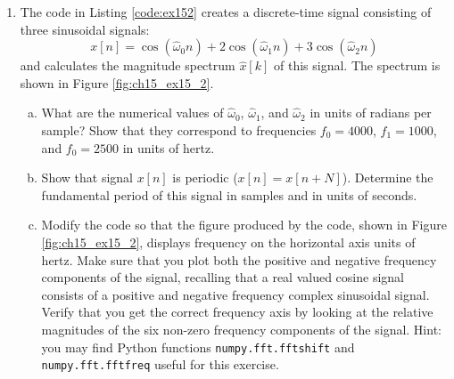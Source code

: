 \begin{enumerate}
\item The code in Listing \ref{code:ex152} creates a discrete-time signal consisting of three sinusoidal signals:
\begin{equation}
x[n]=\cos(\hat{\omega}_0 n)+2\cos(\hat{\omega}_1 n)+3\cos(\hat{\omega}_2 n)
\label{eq:ex15_2}
\end{equation}
and calculates the magnitude spectrum $\hat{x}[k]$ of this signal. The spectrum is shown in Figure \ref{fig:ch15_ex15_2}.



\begin{enumerate}[a)]
    \item What are the numerical values of $\hat{\omega}_0$, $\hat{\omega}_1$, and $\hat{\omega}_2$ in units of radians per sample? Show that they correspond to frequencies $f_0=4000$, $f_1=1000$, and $f_0=2500$ in units of hertz.
    \item Show that signal $x[n]$ is periodic ($x[n]=x[n+N]$). Determine the fundamental period of this signal in samples and in units of seconds. 
    \item Modify the code so that the figure produced by the code, shown in Figure \ref{fig:ch15_ex15_2}, displays frequency on the horizontal axis units of hertz. Make sure that you plot both the positive and negative frequency components of the signal, recalling that a real valued cosine signal consists of a positive and negative frequency complex sinusoidal signal. Verify that you get the correct frequency axis by looking at the relative magnitudes of the six non-zero frequency components of the signal. Hint: you may find Python functions \verb|numpy.fft.fftshift| and \verb|numpy.fft.fftfreq| useful for this exercise.
\end{enumerate}



\end{enumerate}
